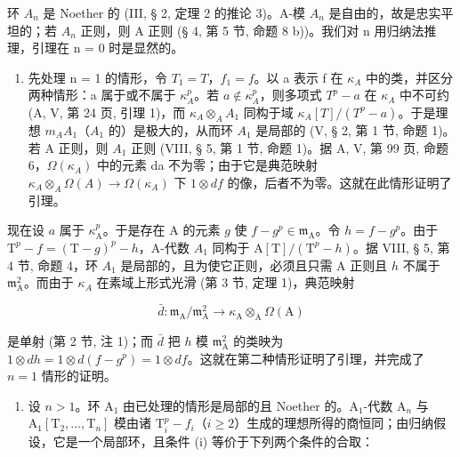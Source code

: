 环 \(A_{n}\) 是 Noether 的 (III, § 2, 定理 2 的推论 3)。A-模 \(A_{n}\) 是自由的，故是忠实平坦的；若 \(A_{n}\) 正则，则 A 正则 (§ 4, 第 5 节, 命题 8 b))。我们对 n 用归纳法推理，引理在 n = 0 时是显然的。

\begin{enumerate}
\def\labelenumi{\Alph{enumi})}
\tightlist
\item
  先处理 n = 1 的情形，令 \(T_{1} = T\)，\(f_{1} = f\)。以 a 表示 f 在 \(\kappa_{A}\) 中的类，并区分两种情形：a 属于或不属于 \(\kappa_{A}^{p}\)。若 \(a \notin \kappa_{A}^{p}\)，则多项式 \(T^{p} - a\) 在 \(\kappa_{A}\) 中不可约 (A, V, 第 24 页, 引理 1)，而 \(\kappa_{A} \otimes_{A} A_{1}\) 同构于域 \(\kappa_{A}[T]/(T^{p} - a)\)。于是理想 \(m_{A}A_{1}\)（\(A_{1}\) 的）是极大的，从而环 \(A_{1}\) 是局部的 (V, § 2, 第 1 节, 命题 1)。若 A 正则，则 \(A_{1}\) 正则 (VIII, § 5, 第 1 节, 命题 1)。据 A, V, 第 99 页, 命题 6，\(\Omega(\kappa_{A})\) 中的元素 da 不为零；由于它是典范映射 \(\kappa_{A} \otimes_{A} \Omega(A) \to \Omega(\kappa_{A})\) 下 \(1 \otimes df\) 的像，后者不为零。这就在此情形证明了引理。
\end{enumerate}

现在设 \(a\) 属于 \(\kappa_{\mathrm{A}}^{p}\)。于是存在 A 的元素 \(g\) 使 \(f - g^{p} \in \mathfrak{m}_{\mathrm{A}}\)。令 \(h = f - g^{p}\)。由于 \(\mathrm{T}^{p} - f = (\mathrm{T} - g)^{p} - h\)，A-代数 \(A_{1}\) 同构于 \(\mathrm{A}[\mathrm{T}] / (\mathrm{T}^{p} - h)\)。据 VIII, § 5, 第 4 节, 命题 4，环 \(A_{1}\) 是局部的，且为使它正则，必须且只需 A 正则且 \(h\) 不属于 \(\mathfrak{m}_{\mathrm{A}}^{2}\)。而由于 \(\kappa_{A}\) 在素域上形式光滑 (第 3 节, 定理 1)，典范映射

\[
\bar {d}: \mathfrak {m} _ {\mathrm{A}} / \mathfrak {m} _ {\mathrm{A}} ^ {2} \to \kappa_ {\mathrm{A}} \otimes_ {\mathrm{A}} \Omega (\mathrm{A})
\]

是单射 (第 2 节, 注 1)；而 \(\bar{d}\) 把 \(h\) 模 \(\mathfrak{m}_{\mathrm{A}}^{2}\) 的类映为 \(1 \otimes dh = 1 \otimes d(f - g^{p}) = 1 \otimes df\)。这就在第二种情形证明了引理，并完成了 \(n = 1\) 情形的证明。

\begin{enumerate}
\def\labelenumi{\Alph{enumi})}
\setcounter{enumi}{1}
\tightlist
\item
  设 \(n > 1\)。环 \(\mathrm{A}_{1}\) 由已处理的情形是局部的且 Noether 的。\(\mathrm{A}_{1}\)-代数 \(\mathrm{A}_{n}\) 与 \(\mathrm{A}_{1}[\mathrm{T}_{2},\ldots ,\mathrm{T}_{n}]\) 模由诸 \(\mathrm{T}_i^p -f_i\)（\(i\geqslant 2\)）生成的理想所得的商恒同；由归纳假设，它是一个局部环，且条件 (i) 等价于下列两个条件的合取：
\end{enumerate}

